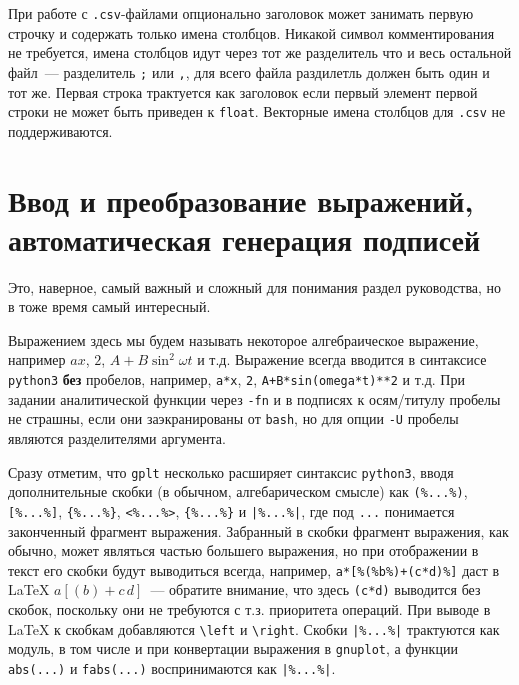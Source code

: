 \documentclass[12pt]{article}
\def\gplt{{\tt gplt}}
\def\gnuplot{{\tt gnuplot}}
\def\python{{\tt python3}}
\begin{document}
При работе с \verb'.csv'-файлами опционально заголовок может занимать первую строчку и содержать только имена столбцов. Никакой символ комментирования не требуется,
имена столбцов идут через тот же разделитель что и весь остальной файл~--- разделитель \verb';' или \verb',', для всего файла раздилетль должен быть один и тот же.
Первая строка трактуется как заголовок если первый элемент первой строки не может быть приведен к \verb'float'.
Векторные имена столбцов для \verb'.csv' не поддерживаются.

\section{Ввод и преобразование выражений, автоматическая генерация подписей}
\begin{figure}
  \vphantom{.}
  \vspace{-1cm}

\end{figure}
Это, наверное, самый важный и сложный для понимания раздел руководства, но в тоже время самый интересный. 

Выражением здесь мы будем называть некоторое алгебраическое выражение, например $a x$, $2$, $A + B\sin^2\omega t$ и т.д. Выражение всегда вводится
в синтаксисе \python{} {\bf без} пробелов, например, \verb'a*x', \verb'2', \verb'A+B*sin(omega*t)**2' и т.д.
При задании аналитической функции через {\tt -fn} и в подписях к осям/титулу пробелы не страшны, если они
  заэкранированы от {\tt bash}, но для опции {\tt -U} пробелы являются разделителями аргумента. 

  Сразу отметим, что \gplt{} несколько расширяет синтаксис \python{}, вводя дополнительные скобки (в обычном, алгебарическом смысле) как
\verb'(%...%)', \verb'[%...%]', \verb'{%...%}', \verb'<%...%>', \verb'{%...%}' и \verb'|%...%|', где под \verb'...' понимается законченный фрагмент выражения.
Забранный в скобки фрагмент выражения, как обычно, может являться частью большего выражения, но при отображении в текст его скобки будут выводиться всегда, например,
\verb'a*[%(%b%)+(c*d)%]' даст в \LaTeX{}
$a[(b)+c\,d]$~--- обратите внимание, что здесь \verb'(c*d)' выводится без скобок, поскольку они не требуются
с т.з. приоритета операций. При выводе в \LaTeX{} к скобкам добавляются \verb'\left' и \verb'\right'. Скобки \verb'|%...%|' трактуются как модуль,
в том числе и при конвертации выражения в \gnuplot{}, а функции \verb'abs(...)' и \verb'fabs(...)' воспринимаются как \verb'|%...%|'.
\end{document}
